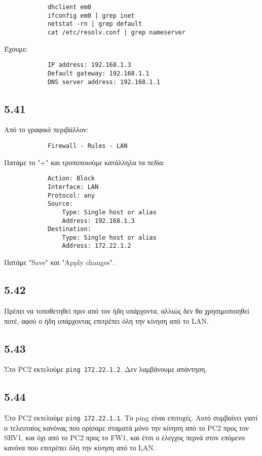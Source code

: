 \documentclass[a4paper, 12pt]{article}
\begin{document}
		\begin{verbatim}
			dhclient em0
			ifconfig em0 | grep inet
			netstat -rn | grep default
			cat /etc/resolv.conf | grep nameserver
		\end{verbatim}
		
		Έχουμε:
		
		\begin{verbatim}
			IP address: 192.168.1.3
			Default gateway: 192.168.1.1
			DNS server address: 192.168.1.1
		\end{verbatim}

	\subsection*{5.41}
		Από το γραφικό περιβάλλον:
		
		\begin{verbatim}
			Firewall - Rules - LAN
		\end{verbatim}
		
		Πατάμε το "+" και τροποποιούμε κατάλληλα τα πεδία:
		
		\begin{verbatim}
			Action: Block
			Interface: LAN
			Protocol: any
			Source: 
			    Type: Single host or alias
			    Address: 192.168.1.3
			Destination:
			    Type: Single host or alias
			    Address: 172.22.1.2
		\end{verbatim}

		Πατάμε "Save" και "Apply changes".
		
	\subsection*{5.42}
		Πρέπει να τοποθετηθεί πριν από τον ήδη υπάρχοντα, αλλιώς δεν θα χρησιμοποιηθεί ποτέ, αφού ο ήδη υπάρχοντας επιτρέπει όλη την κίνηση από το LAN.

	\subsection*{5.43}
		Στο PC2 εκτελούμε \verb|ping 172.22.1.2|. Δεν λαμβάνουμε απάντηση.

	\subsection*{5.44}
		Στο PC2 εκτελούμε \verb|ping 172.22.1.1|. Το ping είναι επιτυχές. Αυτό συμβαίνει γιατί ο τελευταίος κανόνας που ορίσαμε σταματά μόνο την κίνηση από το PC2 προς τον SRV1, και όχι από το PC2 προς το FW1, και έτσι ο έλεγχος περνά στον επόμενο κανόνα που επιτρέπει όλη την κίνηση από το LAN.
\end{document}

